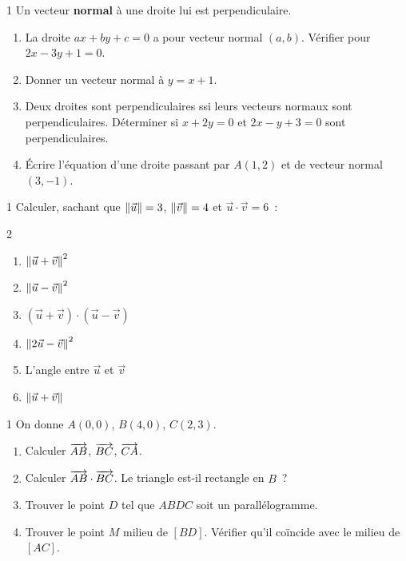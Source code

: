 \begin{exo}{1}
Un vecteur \textbf{normal} \`a une droite lui est perpendiculaire.
\begin{enumerate}
  \item La droite $ax+by+c=0$ a pour vecteur normal $(a,b)$.
        V\'erifier pour $2x-3y+1=0$.
  \item Donner un vecteur normal \`a $y = x+1$.
  \item Deux droites sont perpendiculaires ssi leurs vecteurs normaux sont
        perpendiculaires. D\'eterminer si $x+2y=0$ et $2x-y+3=0$ sont perpendiculaires.
  \item \'Ecrire l'\'equation d'une droite passant par $A(1,2)$ et
        de vecteur normal $(3,-1)$.
\end{enumerate}
\end{exo}

\begin{exo}{1}
Calculer, sachant que $\left\|\vec{u}\right\|=3$, $\left\|\vec{v}\right\|=4$
et $\vec{u}\cdot\vec{v}=6$~:
\begin{multicols}{2}
\begin{enumerate}
  \item $\left\|\vec{u}+\vec{v}\right\|^2$
  \item $\left\|\vec{u}-\vec{v}\right\|^2$
  \item $(\vec{u}+\vec{v})\cdot(\vec{u}-\vec{v})$
  \item $\left\|2\vec{u}-\vec{v}\right\|^2$
  \item L'angle entre $\vec{u}$ et $\vec{v}$
  \item $\left\|\vec{u}+\vec{v}\right\|$
\end{enumerate}
\end{multicols}
\end{exo}

\begin{exo}{1}
On donne $A(0,0)$, $B(4,0)$, $C(2,3)$.
\begin{enumerate}
  \item Calculer $\overrightarrow{AB}$, $\overrightarrow{BC}$, $\overrightarrow{CA}$.
  \item Calculer $\overrightarrow{AB}\cdot\overrightarrow{BC}$.
        Le triangle est-il rectangle en $B$~?
  \item Trouver le point $D$ tel que $ABDC$ soit un parall\'elogramme.
  \item Trouver le point $M$ milieu de $[BD]$.
        V\'erifier qu'il co\"incide avec le milieu de $[AC]$.
\end{enumerate}
\end{exo}

